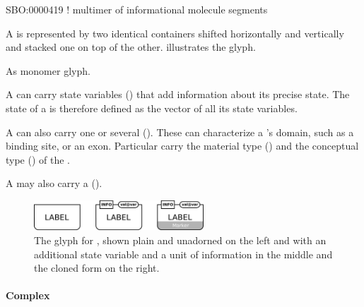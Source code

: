 \begin{glyphDescription}

\glyphSboTerm SBO:0000419 ! multimer of informational molecule segments 

\glyphContainer A  is represented by two identical containers shifted horizontally and vertically and stacked one on top of the other.   illustrates the glyph.

\glyphLabel As monomer glyph.

\glyphAux A  can carry state variables () that add information about its precise state.  The state of a  is therefore defined as the vector of all its state variables. 

A  can also carry one or several  ().  These can characterize a 's domain, such as a binding site, or an exon.  Particular  carry the material type () and the conceptual type () of the . 

A  may also carry a 
().

\end{glyphDescription}

\begin{figure}[H]
  \centering
  \includegraphics[width = 2.5in]{images/genetic}
  \caption{The \PD glyph for , shown plain and
    unadorned on the left and with an additional state variable and a
    unit of information in the middle and the cloned form on the right.} 
  \label{fig:genetic-multimer}
\end{figure}



\paragraph{Complex}\label{sec:complex}

